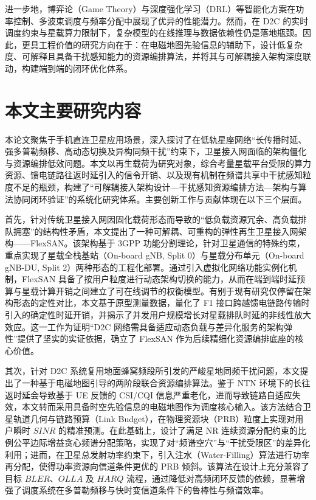 \documentclass[type=master]{fduthesis}
\begin{document}
进一步地，博弈论（Game Theory）与深度强化学习（DRL）等智能化方案在功率控制、多波束调度与频率分配中展现了优异的性能潜力\cite{li2025_game_theoretic,huang2024_drl_rsma}。然而，在 D2C 的实时调度约束与星载算力限制下，复杂模型的在线推理与数据依赖性仍是落地瓶颈\cite{heydarishahreza2024_spectrumsharing}。因此，更具工程价值的研究方向在于：在电磁地图先验信息的辅助下，设计低复杂度、可解释且具备干扰感知能力的资源编排算法，并将其与可解耦接入架构深度联动，构建端到端的闭环优化体系\cite{hoyhtya2017_database,3gpp.38.821}。

\section{本文主要研究内容}
本论文聚焦于手机直连卫星应用场景，深入探讨了在低轨星座网络“长传播时延、强多普勒频移、高动态切换及异构同频干扰”约束下，卫星接入网面临的架构僵化与资源编排低效问题。本文以再生载荷为研究对象，综合考量星载平台受限的算力资源、馈电链路往返时延引入的信令开销、以及现有机制在频谱共享中干扰感知粒度不足的瓶颈，构建了“可解耦接入架构设计—干扰感知资源编排方法—架构与算法协同闭环验证”的系统化研究体系。主要创新工作与贡献体现在以下三个层面。

首先，针对传统卫星接入网因固化载荷形态而导致的“低负载资源冗余、高负载排队拥塞”的结构性矛盾，本文提出了一种可解耦、可重构的弹性再生卫星接入网架构——FlexSAN。该架构基于 3GPP 功能分割理论，针对卫星通信的特殊约束，重点实现了星载全栈基站（On-board gNB, Split 0）与星载分布单元（On-board gNB-DU, Split 2）两种形态的工程化部署。通过引入虚拟化网络功能实例化机制，FlexSAN 具备了按用户粒度进行动态架构切换的能力，从而在端到端时延预算与星载计算开销之间建立了可在线调节的权衡模型。有别于现有研究仅停留在架构形态的定性对比，本文基于原型测量数据，量化了 F1 接口跨越馈电链路传输时引入的确定性时延开销，并揭示了并发用户规模增长对星载排队时延的非线性放大效应。这一工作为证明“D2C 网络需具备适应动态负载与差异化服务的架构弹性”提供了坚实的实证依据，确立了 FlexSAN 作为后续精细化资源编排底座的核心价值。

其次，针对 D2C 系统复用地面蜂窝频段所引发的严峻星地同频干扰问题，本文提出了一种基于电磁地图引导的两阶段联合资源编排算法。鉴于 NTN 环境下的长往返时延会导致基于 UE 反馈的 CSI/CQI 信息严重老化，进而导致链路自适应失效，本文转而采用具备时空先验信息的电磁地图作为调度核心输入。该方法结合卫星轨道几何与链路预算（Link Budget），在物理资源块（PRB）粒度上实现对用户瞬时 $SINR$ 的精准预测。在此基础上，设计了满足 NR 连续资源分配约束的比例公平边际增益贪心频谱分配策略，实现了对“频谱空穴”与“干扰受限区”的差异化利用；进而，在卫星总发射功率约束下，引入注水（Water-Filling）算法进行功率再分配，使得功率资源向信道条件更优的 PRB 倾斜。该算法在设计上充分兼容了目标 $BLER$、$OLLA$ 及 $HARQ$ 流程，通过降低对高频闭环反馈的依赖，显著增强了调度系统在多普勒频移与快时变信道条件下的鲁棒性与频谱效率。
\end{document}

